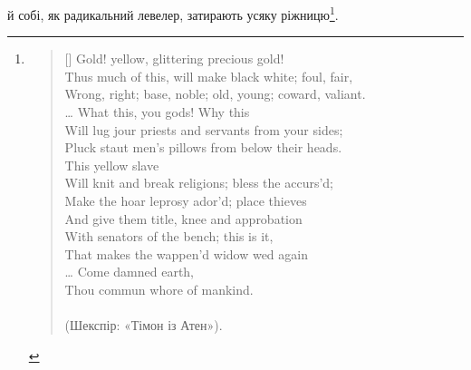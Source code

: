 й собі, як радикальний левелер, затирають усяку ріжницю\footnote{
\settowidth{\versewidth}{Wrong, right; base, noble; old, young; coward, valiant.}
\begin{verse}[\versewidth]
\vspace{-\dimexpr\baselineskip+\topsep}
Gold! yellow, glittering precious gold! \\
Thus much of this, will make black white; foul, fair, \\
Wrong, right; base, noble; old, young; coward, valiant. \\
\dots{} What this, you gods! Why this \\
Will lug jour priests and servants from your sides; \\
Pluck staut men’s pillows from below their heads. \\
This yellow slave \\
Will knit and break religions; bless the accurs'd; \\
Make the hoar leprosy ador’d; place thieves \\
And give them title, knee and approbation \\
With senators of the bench; this is it, \\
That makes the wappen’d widow wed again \\
\dots{} Come damned earth, \\
Thou commun whore of mankind. \\
\\
\smallskip
(Шекспір: «Тімон із Атен»).
\end{verse}
}.
